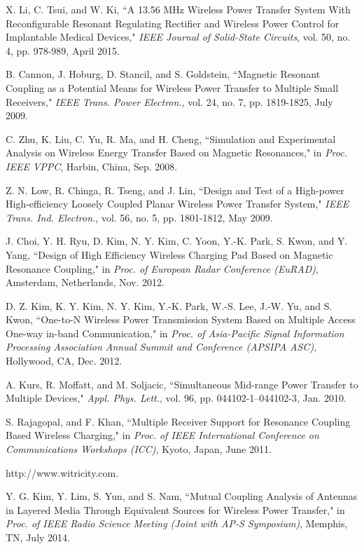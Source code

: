 \documentclass[twocolumn,10pt]{IEEEtran}
\begin{document}
\begin{thebibliography}{99}
X. Li, C. Tsui, and W. Ki, ``A 13.56 MHz Wireless Power Transfer System With Reconfigurable Resonant Regulating Rectifier and Wireless Power Control for Implantable Medical Devices," 
\emph{IEEE Journal of Solid-State Circuits}, 
vol. 50, no. 4,  pp. 978-989, April  2015. 

B. Cannon, J. Hoburg, D. Stancil, and S. Goldstein, ``Magnetic Resonant
Coupling as a Potential Means for Wireless Power Transfer to Multiple Small Receivers," \emph{IEEE Trans. Power Electron.}, vol. 24, no. 7, pp. 1819-1825, July 2009.


C. Zhu, K. Liu, C. Yu, R. Ma, and H. Cheng, ``Simulation and Experimental Analysis on Wireless Energy Transfer Based on Magnetic Resonances," in \emph{Proc. IEEE VPPC}, Harbin, China, Sep. 2008.


Z. N. Low, R. Chinga, R. Tseng, and J. Lin, ``Design and Test of a
High-power High-efficiency Loosely Coupled Planar Wireless Power Transfer System," \emph{IEEE Trans. Ind. Electron.}, vol. 56, no. 5, pp. 1801-1812, May 2009.

J. Choi, Y. H. Ryu, D. Kim, N. Y. Kim, C. Yoon, Y.-K. Park, S. Kwon, and Y. Yang, ``Design of High Efficiency Wireless Charging Pad Based on Magnetic Resonance Coupling," in \emph{Proc. of European Radar Conference (EuRAD)}, Amsterdam, Netherlands, Nov. 2012.

D. Z. Kim, K. Y. Kim, N. Y. Kim, Y.-K. Park, W.-S. Lee, J.-W. Yu, and S. Kwon, ``One-to-N Wireless Power Transmission System Based on Multiple Access One-way in-band Communication," in \emph{Proc. of Asia-Pacific Signal  Information Processing Association Annual Summit and Conference (APSIPA ASC)}, Hollywood, CA, Dec. 2012.

A. Kurs, R. Moffatt, and M. Soljacic, ``Simultaneous Mid-range Power Transfer to Multiple Devices," \emph{Appl. Phys. Lett.}, vol. 96, pp. 044102-1–044102-3, Jan. 2010.
 

 S. Rajagopal, and F. Khan, ``Multiple Receiver Support for Resonance Coupling Based Wireless Charging," in \emph{Proc. of  IEEE International Conference on Communications Workshops (ICC)}, Kyoto, Japan, June 2011.

http://www.witricity.com.

Y. G. Kim, Y. Lim, S. Yun, and S. Nam, ``Mutual Coupling Analysis of Antennas in Layered Media Through Equivalent Sources for Wireless Power Transfer," 
in \emph{Proc. of IEEE Radio Science Meeting (Joint with AP-S Symposium)}, Memphis, TN, July 2014.


\end{thebibliography}
\end{document}
